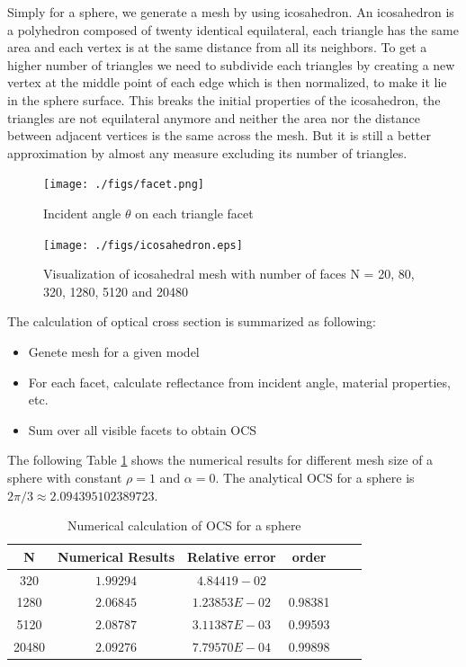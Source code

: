 \documentclass[11pt,reqno]{amsart}
\theoremstyle{definition}
\begin{document}
Simply for a sphere, we generate a mesh by using icosahedron. An icosahedron is a polyhedron composed of twenty identical equilateral, each triangle has the same area and each vertex is at the same distance from all its neighbors. To get a higher number of triangles we need to subdivide each triangles by creating a new vertex at the middle point of each edge which is then normalized, to make it lie in the sphere surface. This breaks the initial properties of the icosahedron, the triangles are not equilateral anymore and neither the area nor the distance between adjacent vertices is the same across the mesh. But it is still a better approximation by almost any measure excluding its number of triangles. 

\begin{figure}[H]  	\centerline{\texttt{[image: ./figs/facet.png]}}
		\caption{Incident angle $\theta$ on each triangle facet}
        \label{fig:facet}
\end{figure}

\begin{figure}[H] 	\centerline{\texttt{[image: ./figs/icosahedron.eps]}}
		\caption{Visualization of icosahedral mesh with number of faces N = 20, 80, 320, 1280, 5120 and 20480}
        \label{fig:icosahedron}
\end{figure}

The calculation of optical cross section is summarized as following:
\begin{itemize}
\item Genete mesh for a given model
\item For each facet, calculate reflectance from incident angle, material properties, etc.
\item Sum over all visible facets to obtain OCS
\end{itemize} 
The following Table \ref{table: sphere OCS} shows the numerical results for different mesh size of a sphere with constant $\rho=1$ and $\alpha=0$. The analytical OCS for a sphere is $2\pi/3\approx 2.094395102389723$.
\begin{table}[H]
	\small
	\caption{Numerical calculation of OCS for a sphere
	}
	\centering
	\begin{tabular}{|c|c|c|c|c|c|}
	\hline
	N & Numerical Results & Relative error & order \\
	\hline
	320 & $1.99294$ & $4.84419-02$ &  \\
    \hline	
	1280 & $2.06845$ & $1.23853E-02$ & 0.98381 \\
    \hline	
	5120 & $2.08787$ & $3.11387E-03$ & 0.99593 \\
	\hline
	20480 & $2.09276$ & $7.79570E-04$ & 0.99898 \\
	\hline
	\end{tabular}
	\label{table: sphere OCS}
\end{table}
  
\end{document}
